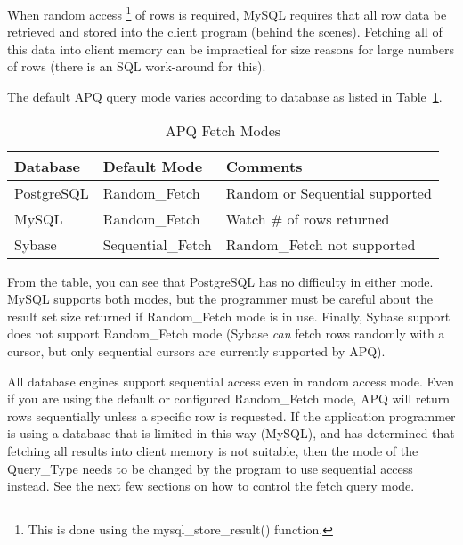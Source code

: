 \documentclass[english,letterpaper]{book}
\begin{document}
When random access%
\footnote{This is done using the mysql\_store\_result() function.%
} of rows is required, MySQL requires that all row data be retrieved
and stored into the client program (behind the scenes). Fetching all
of this data into client memory can be impractical for size reasons
for large numbers of rows (there is an SQL work-around for this).

The default APQ query mode varies according to database as listed in Table~\ref{t:fchmd}.

\begin{table}
   \begin{center}
      \begin{tabular}{lll}
         Database       &  Default Mode      &  Comments\\
         \hline 
         PostgreSQL     &  Random\_Fetch     &  Random or Sequential supported\\
         MySQL          &  Random\_Fetch     &  Watch \# of rows returned\\
         Sybase         &  Sequential\_Fetch &  Random\_Fetch not supported\\
      \end{tabular}
   \end{center}
   \caption{APQ Fetch Modes}\label{t:fchmd}
\end{table}

From the table, you can see that PostgreSQL has no difficulty in either
mode. MySQL supports both modes, but the programmer must be careful
about the result set size returned if Random\_Fetch mode is in use.
Finally, Sybase support does not support Random\_Fetch mode (Sybase
\emph{can} fetch rows randomly with a cursor, but only sequential
cursors are currently supported by APQ).

All database engines support sequential access \- even in random
access mode. Even if you are using the default or configured Random\_Fetch
mode, APQ will return rows sequentially unless a specific row is requested.
If the application programmer is using a database that is limited
in this way (MySQL), and has determined that fetching all results
into client memory is not suitable, then the mode of the Query\_Type
needs to be changed by the program to use sequential access instead.
See the next few sections on how to control the fetch query mode.
\end{document}
